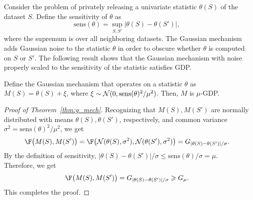Consider the problem of privately releasing a univariate statistic $\theta(S)$ of the dataset $S$. Define the sensitivity of $\theta$ as
\[
\mathrm{sens}(\theta) = \sup_{S, S'} | \theta(S) - \theta(S') |,
\]
where the supremum is over all neighboring datasets. The Gaussian mechanism adds Gaussian noise to the statistic $\theta$ in order to obscure whether $\theta$ is computed on $S$ or $S'$. The following result shows that the Gaussian mechanism with noise properly scaled to the sensitivity of the statistic satisfies GDP.
\begin{theorem}\label{thm:g_mech}
Define the Gaussian mechanism that operates on a statistic $\theta$ as $M(S) = \theta(S) + \xi$, where $\xi \sim \mathcal{N}(0, \mathrm{sens}(\theta)^2/\mu^2)$. Then, $M$ is $\mu$-GDP.
\end{theorem}
\begin{proof}[Proof of Theorem~\ref{thm:g_mech}]
Recognizing that $M(S), M(S')$ are normally distributed with means $\theta(S), \theta(S')$, respectively, and common variance $\sigma^2 = \mathrm{sens}(\theta)^2/\mu^2$, we get
\begin{align*}
\F\big(M(S),M(S')\big) = \F\big( \N(\theta(S), \sigma^2), \N(\theta(S'), \sigma^2)\big) = G_{|\theta(S)-\theta(S')|/\sigma}.
\end{align*}
By the definition of sensitivity, $|\theta(S)-\theta(S')|/\sigma \le \mathrm{sens}(\theta)/\sigma = \mu$. Therefore, we get
\[
\F\big(M(S),M(S')\big) = G_{|\theta(S)-\theta(S')|/\sigma} \geqslant G_\mu.
\]
This completes the proof.
\end{proof}



